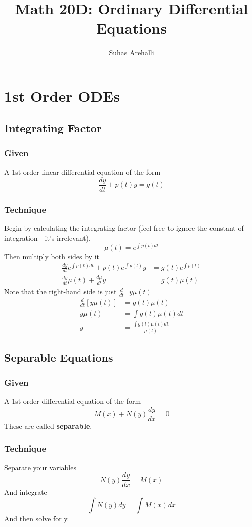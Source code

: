 \documentclass[11pt]{article}
\title{Math 20D: Ordinary Differential Equations}
\author{Suhas Arehalli}
\begin{document}
\maketitle

\section{1st Order ODEs}
\subsection{Integrating Factor}
\subsubsection{Given}
A 1st order linear differential equation of the form
    \[ \frac{dy}{dt} + p(t)y = g(t) \]
\subsubsection{Technique}
Begin by calculating the integrating factor (feel free to ignore the constant of integration - it's 
irrelevant),
    \[ \mu (t) = e^{\int p(t)dt} \]
Then multiply both sides by it
\begin{align*}
    \frac{dy}{dt} e^{\int p(t)dt} + p(t)e^{\int p(t)}y &= g(t)e^{\int p(t)}  \\
    \frac{dy}{dt} \mu (t) + \frac{d\mu}{dt}y &= g(t)\mu (t) 
\end{align*}
Note that the right-hand side is just $\frac{d}{dt}[y \mu (t)]$
\begin{align*}
    \frac{d}{dt}[y \mu (t)] &= g(t)\mu (t) \\
    y \mu(t) &= \int g(t)\mu (t)dt \\
    y &= \frac{\int g(t) \mu (t)dt}{\mu (t)}
\end{align*}


\subsection{Separable Equations}
\subsubsection{Given}
A 1st order differential equation of the form 
    \[ M(x) + N(y)\frac{dy}{dx} = 0 \]
These are called \textbf{separable}.
\subsubsection{Technique}
Separate your variables
    \[ N(y)\frac{dy}{dx} = M(x) \]
And integrate
    \[ \int N(y)dy = \int M(x)dx \]
And then solve for y.
\end{document}
